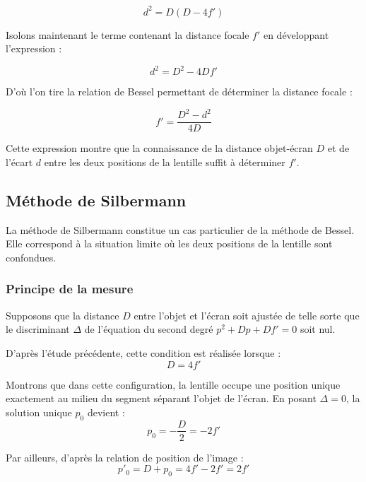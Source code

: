 \begin{equation}
    d^{2} = D(D - 4f')
\end{equation}

Isolons maintenant le terme contenant la distance focale $f'$ 
en développant l'expression :

\begin{equation}
    d^{2} = D^{2} - 4Df'
\end{equation}

D'où l'on tire la relation de Bessel 
permettant de déterminer la distance focale :

\begin{equation}
    f' = \frac{D^{2} - d^{2}}{4D}
\end{equation}

Cette expression montre que la connaissance de la distance objet-écran $D$ 
et de l'écart $d$ entre les deux positions de la lentille 
suffit à déterminer $f'$.

\subsection{Méthode de Silbermann}

La méthode de Silbermann constitue un cas particulier 
de la méthode de Bessel. 
Elle correspond à la situation limite 
où les deux positions de la lentille sont confondues.

\subsubsection{Principe de la mesure}

Supposons que la distance $D$ entre l'objet et l'écran 
soit ajustée de telle sorte que le discriminant $\Delta$ 
de l'équation du second degré $p^{2} + Dp + Df' = 0$ soit nul. 

D'après l'étude précédente, 
cette condition est réalisée lorsque :
\begin{equation}
    D = 4f'
\end{equation}

Montrons que dans cette configuration, 
la lentille occupe une position unique 
exactement au milieu du segment séparant l'objet de l'écran. 
En posant $\Delta = 0$, la solution unique $p_{0}$ devient :
\begin{equation}
    p_{0} = -\frac{D}{2} = -2f'
\end{equation}

Par ailleurs, d'après la relation de position de l'image :
\begin{equation}
    p'_{0} = D + p_{0} = 4f' - 2f' = 2f'
\end{equation}

